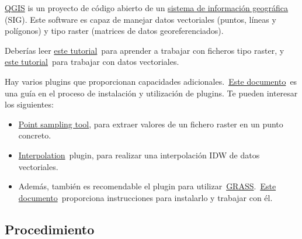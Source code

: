 \documentclass[11pt]{article}
\begin{document}
\href{https://qgis.org/es/site/}{QGIS} is un proyecto de código abierto de un \href{https://es.wikipedia.org/wiki/Sistema\_de\_informaci\%C3\%B3n\_geogr\%C3\%A1fica}{sistema de información
geográfica} (SIG). Este software es capaz de manejar datos
vectoriales (puntos, líneas y polígonos) y tipo raster (matrices de
datos georeferenciados).

Deberías leer \href{https://docs.qgis.org/3.22/es/docs/user\_manual/working\_with\_raster/index.html}{este tutorial} para aprender a trabajar con ficheros tipo
raster, y \href{http://docs.qgis.org/3.22/es/docs/user\_manual/working\_with\_vector/index.html}{este tutorial} para trabajar con datos vectoriales.

Hay varios plugins que proporcionan capacidades adicionales. \href{https://docs.qgis.org/3.22/es/docs/training\_manual/qgis\_plugins/fetching\_plugins.html}{Este
documento} es una guía en el proceso de instalación y utilización de
plugins. Te pueden interesar los siguientes:

\begin{itemize}
\item \href{https://plugins.qgis.org/plugins/pointsamplingtool/}{Point sampling tool}, para extraer valores de un fichero raster en un
punto concreto.
\item \href{https://docs.qgis.org/3.22/es/docs/user\_manual/plugins/plugins\_interpolation.html}{Interpolation} plugin, para realizar una interpolación IDW de datos
vectoriales.
\item Además, también es recomendable el plugin para utilizar \href{https://grass.osgeo.org/}{GRASS}. \href{http://docs.qgis.org/3.22/es/docs/user\_manual/grass\_integration/grass\_integration.html}{Este
documento} proporciona instrucciones para instalarlo y trabajar con
él.
\end{itemize}

\subsection*{Procedimiento}
\label{sec:orge72c353}
\end{document}
